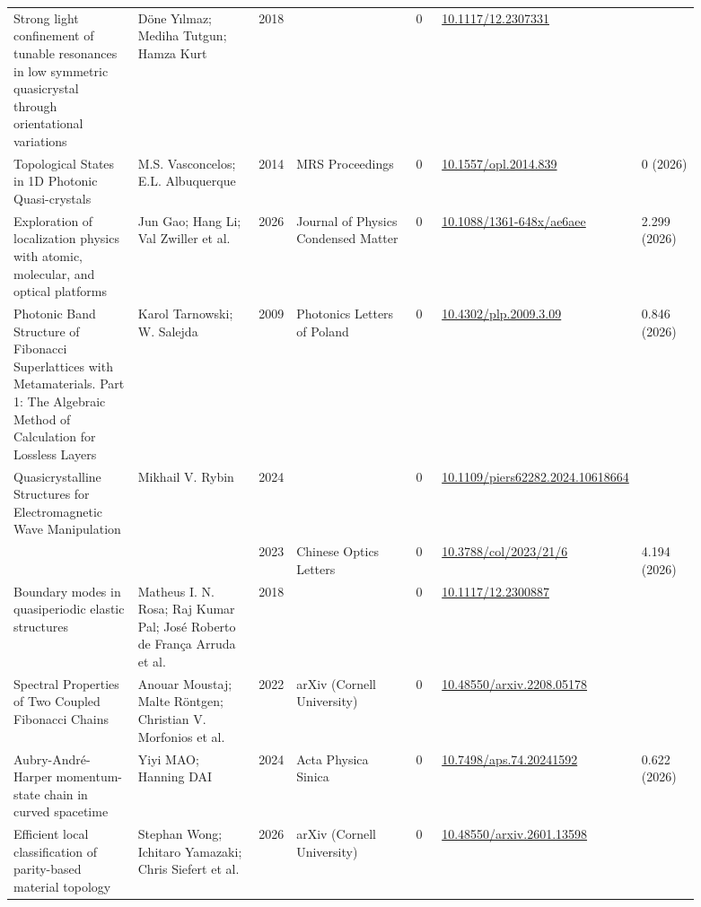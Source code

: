 \documentclass[10pt,a4paper]{article}
\begin{document}
{\begin{longtable}{p{0.192\linewidth}p{0.192\linewidth}p{0.043\linewidth}p{0.192\linewidth}p{0.043\linewidth}p{0.132\linewidth}p{0.096\linewidth}}
Strong light confinement of tunable resonances in low symmetric quasicrystal through orientational variations & Döne Yılmaz; Mediha Tutgun; Hamza Kurt & 2018 &  & 0 & \href{https://doi.org/10.1117/12.2307331}{10.1117/12.2307331} &  \\
Topological States in 1D Photonic Quasi-crystals & M.S. Vasconcelos; E.L. Albuquerque & 2014 & MRS Proceedings & 0 & \href{https://doi.org/10.1557/opl.2014.839}{10.1557/opl.2014.839} & 0 (2026) \\
Exploration of localization physics with atomic, molecular, and optical platforms & Jun Gao; Hang Li; Val Zwiller et al. & 2026 & Journal of Physics Condensed Matter & 0 & \href{https://doi.org/10.1088/1361-648x/ae6aee}{10.1088/1361-648x/ae6aee} & 2.299 (2026) \\
Photonic Band Structure of Fibonacci Superlattices with Metamaterials. Part 1: The Algebraic Method of Calculation for Lossless Layers & Karol Tarnowski; W. Salejda & 2009 & Photonics Letters of Poland & 0 & \href{https://doi.org/10.4302/plp.2009.3.09}{10.4302/plp.2009.3.09} & 0.846 (2026) \\
Quasicrystalline Structures for Electromagnetic Wave Manipulation & Mikhail V. Rybin & 2024 &  & 0 & \href{https://doi.org/10.1109/piers62282.2024.10618664}{10.1109/piers62282.2024.10618664} &  \\
 &  & 2023 & Chinese Optics Letters & 0 & \href{https://doi.org/10.3788/col/2023/21/6}{10.3788/col/2023/21/6} & 4.194 (2026) \\
Boundary modes in quasiperiodic elastic structures & Matheus I. N. Rosa; Raj Kumar Pal; José Roberto de França Arruda et al. & 2018 &  & 0 & \href{https://doi.org/10.1117/12.2300887}{10.1117/12.2300887} &  \\
Spectral Properties of Two Coupled Fibonacci Chains & Anouar Moustaj; Malte Röntgen; Christian V. Morfonios et al. & 2022 & arXiv (Cornell University) & 0 & \href{https://doi.org/10.48550/arxiv.2208.05178}{10.48550/arxiv.2208.05178} &  \\
Aubry-André-Harper momentum-state chain in curved spacetime & Yiyi MAO; Hanning DAI & 2024 & Acta Physica Sinica & 0 & \href{https://doi.org/10.7498/aps.74.20241592}{10.7498/aps.74.20241592} & 0.622 (2026) \\
Efficient local classification of parity-based material topology & Stephan Wong; Ichitaro Yamazaki; Chris Siefert et al. & 2026 & arXiv (Cornell University) & 0 & \href{https://doi.org/10.48550/arxiv.2601.13598}{10.48550/arxiv.2601.13598} &  \\

\end{longtable}}
\end{document}
